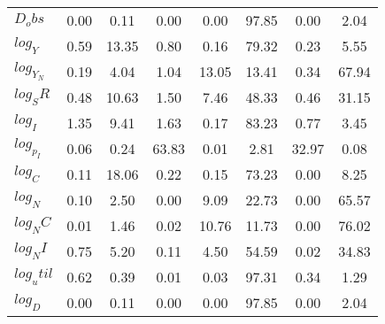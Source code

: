 \begin{center}
\begin{longtable}{lccccccc}
$D_obs     $	 & 	        0.00	 & 	        0.11	 & 	        0.00	 & 	        0.00	 & 	       97.85	 & 	        0.00	 & 	        2.04 \\ 
$log_Y     $	 & 	        0.59	 & 	       13.35	 & 	        0.80	 & 	        0.16	 & 	       79.32	 & 	        0.23	 & 	        5.55 \\ 
$log_Y_N   $	 & 	        0.19	 & 	        4.04	 & 	        1.04	 & 	       13.05	 & 	       13.41	 & 	        0.34	 & 	       67.94 \\ 
$log_SR    $	 & 	        0.48	 & 	       10.63	 & 	        1.50	 & 	        7.46	 & 	       48.33	 & 	        0.46	 & 	       31.15 \\ 
$log_I     $	 & 	        1.35	 & 	        9.41	 & 	        1.63	 & 	        0.17	 & 	       83.23	 & 	        0.77	 & 	        3.45 \\ 
$log_p_I   $	 & 	        0.06	 & 	        0.24	 & 	       63.83	 & 	        0.01	 & 	        2.81	 & 	       32.97	 & 	        0.08 \\ 
$log_C     $	 & 	        0.11	 & 	       18.06	 & 	        0.22	 & 	        0.15	 & 	       73.23	 & 	        0.00	 & 	        8.25 \\ 
$log_N     $	 & 	        0.10	 & 	        2.50	 & 	        0.00	 & 	        9.09	 & 	       22.73	 & 	        0.00	 & 	       65.57 \\ 
$log_NC    $	 & 	        0.01	 & 	        1.46	 & 	        0.02	 & 	       10.76	 & 	       11.73	 & 	        0.00	 & 	       76.02 \\ 
$log_NI    $	 & 	        0.75	 & 	        5.20	 & 	        0.11	 & 	        4.50	 & 	       54.59	 & 	        0.02	 & 	       34.83 \\ 
$log_util  $	 & 	        0.62	 & 	        0.39	 & 	        0.01	 & 	        0.03	 & 	       97.31	 & 	        0.34	 & 	        1.29 \\ 
$log_D     $	 & 	        0.00	 & 	        0.11	 & 	        0.00	 & 	        0.00	 & 	       97.85	 & 	        0.00	 & 	        2.04 \\ 
\end{longtable}
 \end{center}
